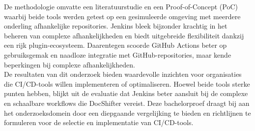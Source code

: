 De methodologie omvatte een literatuurstudie en een Proof-of-Concept (PoC) waarbij beide tools werden getest op een gesimuleerde omgeving met meerdere onderling afhankelijke repositories. Jenkins bleek bijzonder krachtig in het beheren van complexe afhankelijkheden en biedt uitgebreide flexibiliteit dankzij een rijk plugin-ecosysteem. Daarentegen scoorde GitHub Actions beter op gebruiksgemak en naadloze integratie met GitHub-repositories, maar kende beperkingen bij complexe afhankelijkheden.\\

De resultaten van dit onderzoek bieden waardevolle inzichten voor organisaties die CI/CD-tools willen implementeren of optimaliseren. Hoewel beide tools sterke punten hebben, blijkt uit de evaluatie dat Jenkins beter aansluit bij de complexe en schaalbare workflows die DocShifter vereist. Deze bachelorproef draagt bij aan het onderzoeksdomein door een diepgaande vergelijking te bieden en richtlijnen te formuleren voor de selectie en implementatie van CI/CD-tools.


